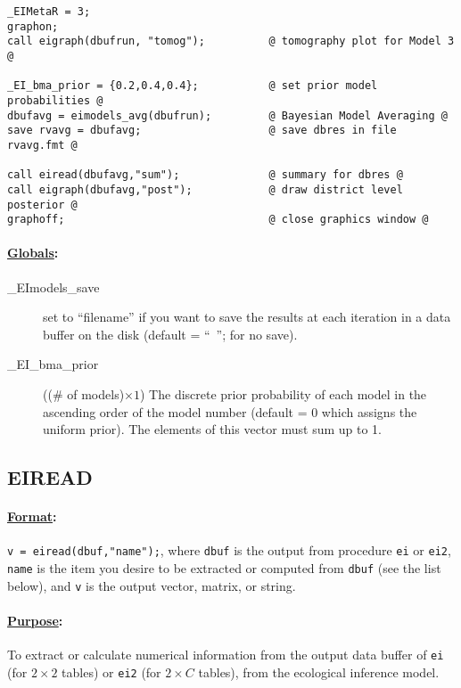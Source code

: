 \documentclass[11pt,titlepage]{article}
\begin{document}
\begin{verbatim}
_EIMetaR = 3;
graphon;
call eigraph(dbufrun, "tomog");          @ tomography plot for Model 3 @

_EI_bma_prior = {0.2,0.4,0.4};           @ set prior model probabilities @
dbufavg = eimodels_avg(dbufrun);         @ Bayesian Model Averaging @
save rvavg = dbufavg;                    @ save dbres in file rvavg.fmt @

call eiread(dbufavg,"sum");              @ summary for dbres @
call eigraph(dbufavg,"post");            @ draw district level posterior @
graphoff;                                @ close graphics window @
\end{verbatim} 

\paragraph{\underline{Globals}:}
\begin{description}
\item[\_EImodels\_save] set to ``filename'' if you want to save the
  results at each iteration in a data buffer on the disk (default =
  ``\mbox{ }''; for no save).
  
\item[\_EI\_bma\_prior] (($\#$ of models)$\times 1$) The discrete
  prior probability of each model in the ascending order of the model
  number (default = 0 which assigns the uniform prior). The elements
  of this vector must sum up to 1.
\end{description}

\subsection{EIREAD} \label{eiread}

\paragraph{\underline{Format}:} \texttt{v = eiread(dbuf,"name");}, where
\texttt{dbuf} is the output from procedure \texttt{ei} or
\texttt{ei2}, \texttt{name} is the item you desire to be extracted or
computed from \texttt{dbuf} (see the list below), and \texttt{v} is
the output vector, matrix, or string.

\paragraph{\underline{Purpose}:}
To extract or calculate numerical information from the output data
buffer of \texttt{ei} (for $2\times 2$ tables) or \texttt{ei2} (for
$2\times C$ tables), from the ecological inference model.
\end{document}
